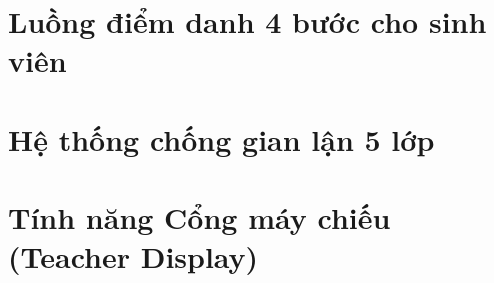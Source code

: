 \section{Luồng điểm danh 4 bước cho sinh viên}
\label{sec:attendance-flow}

\section{Hệ thống chống gian lận 5 lớp}
\label{sec:anti-fraud}

\section{Tính năng Cổng máy chiếu (Teacher Display)}
\label{sec:projector}

